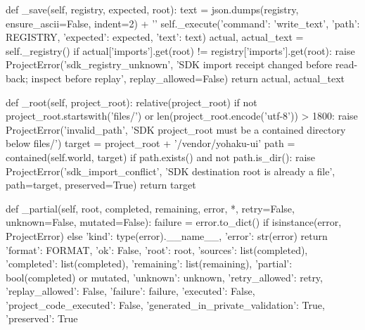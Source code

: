     def _save(self, registry, expected, root):
        text = json.dumps(registry, ensure_ascii=False, indent=2) + '\n'
        self._execute({'command': 'write_text', 'path': REGISTRY, 'expected': expected, 'text': text})
        actual, actual_text = self._registry()
        if actual['imports'].get(root) != registry['imports'].get(root):
            raise ProjectError('sdk_registry_unknown', 'SDK import receipt changed before read-back; inspect before replay', replay_allowed=False)
        return actual, actual_text

    def _root(self, project_root):
        relative(project_root)
        if not project_root.startswith('files/') or len(project_root.encode('utf-8')) > 1800:
            raise ProjectError('invalid_path', 'SDK project_root must be a contained directory below files/')
        target = project_root + '/vendor/yohaku-ui'
        path = contained(self.world, target)
        if path.exists() and not path.is_dir():
            raise ProjectError('sdk_import_conflict', 'SDK destination root is already a file', path=target, preserved=True)
        return target

    def _partial(self, root, completed, remaining, error, *, retry=False, unknown=False, mutated=False):
        failure = error.to_dict() if isinstance(error, ProjectError) else {'kind': type(error).__name__, 'error': str(error)}
        return {'format': FORMAT, 'ok': False, 'root': root, 'sources': list(completed),
                'completed': list(completed), 'remaining': list(remaining), 'partial': bool(completed) or mutated,
                'unknown': unknown, 'retry_allowed': retry, 'replay_allowed': False,
                'failure': failure, 'executed': False, 'project_code_executed': False,
                'generated_in_private_validation': True, 'preserved': True}

